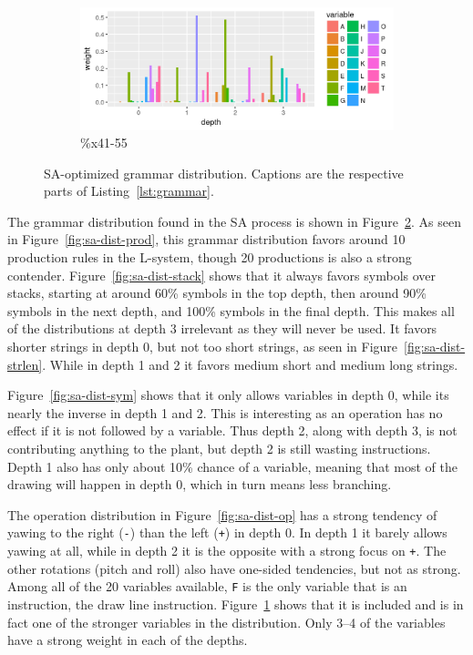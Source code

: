 \begin{figure}
    \ContinuedFloat
    \begin{subfigure}{0.98\textwidth}
        \includegraphics[width=\textwidth]{figures/sa-dist-var}
        \caption{\%x41-55}
        \label{fig:sa-dist-var}
    \end{subfigure}
    \caption[SA-optimized grammar distribution]{SA-optimized grammar distribution. Captions are the respective parts of Listing~\ref{lst:grammar}.}
    \label{fig:sa-dist}
\end{figure}

The grammar distribution found in the SA process is shown in Figure~\ref{fig:sa-dist}.
As seen in Figure~\ref{fig:sa-dist-prod}, this grammar distribution favors around 10 production rules in the L-system, though 20 productions is also a strong contender.
Figure~\ref{fig:sa-dist-stack} shows that it always favors symbols over stacks, starting at around 60\% symbols in the top depth, then around 90\% symbols in the next depth, and 100\% symbols in the final depth.
This makes all of the distributions at depth 3 irrelevant as they will never be used.
It favors shorter strings in depth 0, but not too short strings, as seen in Figure~\ref{fig:sa-dist-strlen}.
While in depth 1 and 2 it favors medium short and medium long strings.

Figure~\ref{fig:sa-dist-sym} shows that it only allows variables in depth 0, while its nearly the inverse in depth 1 and 2.
This is interesting as an operation has no effect if it is not followed by a variable.
Thus depth 2, along with depth 3, is not contributing anything to the plant, but depth 2 is still wasting instructions.
Depth 1 also has only about 10\% chance of a variable, meaning that most of the drawing will happen in depth 0, which in turn means less branching.

The operation distribution in Figure~\ref{fig:sa-dist-op} has a strong tendency of yawing to the right (\texttt{-}) than the left (\texttt{+}) in depth 0.
In depth 1 it barely allows yawing at all, while in depth 2 it is the opposite with a strong focus on \texttt{+}.
The other rotations (pitch and roll) also have one-sided tendencies, but not as strong.
Among all of the 20 variables available, \texttt{F} is the only variable that is an instruction, the draw line instruction.
Figure~\ref{fig:sa-dist-var} shows that it is included and is in fact one of the stronger variables in the distribution.
Only 3--4 of the variables have a strong weight in each of the depths.

